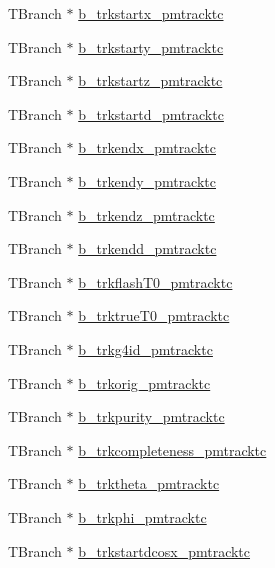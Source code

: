 \begin{DoxyCompactItemize}
\item 
T\-Branch $\ast$ \hyperlink{classanatree_af647774649d318437fdccc981e7d2dd3}{b\-\_\-trkstartx\-\_\-pmtracktc}
\item 
T\-Branch $\ast$ \hyperlink{classanatree_a35c8b329adbccda266a8fd37ade4a55a}{b\-\_\-trkstarty\-\_\-pmtracktc}
\item 
T\-Branch $\ast$ \hyperlink{classanatree_ad5e89ba1e9045423acf8d9685f114b03}{b\-\_\-trkstartz\-\_\-pmtracktc}
\item 
T\-Branch $\ast$ \hyperlink{classanatree_a406072c6934ffb369b2e445b3adba840}{b\-\_\-trkstartd\-\_\-pmtracktc}
\item 
T\-Branch $\ast$ \hyperlink{classanatree_a68b555e286931d3e1c36d963cf527636}{b\-\_\-trkendx\-\_\-pmtracktc}
\item 
T\-Branch $\ast$ \hyperlink{classanatree_a7c2a77fff06b4b8450e3454ac3760d3b}{b\-\_\-trkendy\-\_\-pmtracktc}
\item 
T\-Branch $\ast$ \hyperlink{classanatree_aafaf3bae1ef089935fde2fb02874b623}{b\-\_\-trkendz\-\_\-pmtracktc}
\item 
T\-Branch $\ast$ \hyperlink{classanatree_a4f78769cad9bdd6f7403bd13d704070c}{b\-\_\-trkendd\-\_\-pmtracktc}
\item 
T\-Branch $\ast$ \hyperlink{classanatree_af56746811c5e9d8bcee14ec22bef1c2e}{b\-\_\-trkflash\-T0\-\_\-pmtracktc}
\item 
T\-Branch $\ast$ \hyperlink{classanatree_a929f7c10a224776fcb1fb4ca2be1cfb9}{b\-\_\-trktrue\-T0\-\_\-pmtracktc}
\item 
T\-Branch $\ast$ \hyperlink{classanatree_accaf9659f3b7a1d7dcda0c45f610d5ed}{b\-\_\-trkg4id\-\_\-pmtracktc}
\item 
T\-Branch $\ast$ \hyperlink{classanatree_a10e462f3de5a5e5c0396e26ac36ea30a}{b\-\_\-trkorig\-\_\-pmtracktc}
\item 
T\-Branch $\ast$ \hyperlink{classanatree_a581a622e79179a9c52acf71e3e768480}{b\-\_\-trkpurity\-\_\-pmtracktc}
\item 
T\-Branch $\ast$ \hyperlink{classanatree_ab5c7a1ec336d298c1ea4f587e52b7fd7}{b\-\_\-trkcompleteness\-\_\-pmtracktc}
\item 
T\-Branch $\ast$ \hyperlink{classanatree_a1a523ae53ce709311467e97f1ff1569b}{b\-\_\-trktheta\-\_\-pmtracktc}
\item 
T\-Branch $\ast$ \hyperlink{classanatree_a45485e41f14006da8ce4be3ac67f7ca4}{b\-\_\-trkphi\-\_\-pmtracktc}
\item 
T\-Branch $\ast$ \hyperlink{classanatree_a6ba235f9beb026e48c7f70c61cab06de}{b\-\_\-trkstartdcosx\-\_\-pmtracktc}

\end{DoxyCompactItemize}
